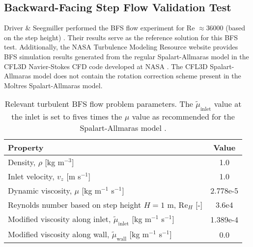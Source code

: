 \FloatBarrier

\subsection{Backward-Facing Step Flow Validation Test}

Driver \& Seegmiller performed the \gls{BFS} flow experiment for Re $\approx36000$ (based on the
step height)
\cite{driver_features_1985}. Their results serve as the reference solution for this \gls{BFS} test.
Additionally, the \gls{NASA} Turbulence Modeling Resource website \cite{rumsey_turbulence_nodate}
provides \gls{BFS} simulation results generated from the regular Spalart-Allmaras model in the CFL3D
Navier-Stokes CFD code developed at \gls{NASA} \cite{krist_cfl3d_1998}. The CFL3D Spalart-Allmaras model
does not contain the rotation correction scheme
\cite{aupoix_extensions_2003, dacles-mariani_numericalexperimental_1995} present in the Moltres
Spalart-Allmaras model.

\begin{table}[htb]
  \centering
  \small
  \caption{Relevant turbulent \gls{BFS} flow problem parameters. The $\tilde{\mu}_\text{inlet}$ value
  at the inlet is set to fives times the $\mu$ value as recommended for the Spalart-Allmaras model
  \cite{spalart_one-equation_1994}.}
  \begin{tabular}{l S}
    \toprule
    Property & {Value} \\
    \midrule
    Density, $\rho$ [kg m$^{-3}$] & 1.0 \\
    Inlet velocity, $v_z$ [m s$^{-1}$] & 1.0 \\
    Dynamic viscosity, $\mu$ [kg m$^{-1}$ s$^{-1}$] & 2.778e-5 \\
    Reynolds number based on step height $H=1$ m, Re$_H$ [-] & 3.6e4 \\
    Modified viscosity along inlet, $\tilde{\mu}_\text{inlet}$ [kg m$^{-1}$ s$^{-1}$] & 1.389e-4 \\
    Modified viscosity along wall, $\tilde{\mu}_\text{wall}$ [kg m$^{-1}$ s$^{-1}$] & 0.0 \\
    \bottomrule
  \end{tabular}
  \label{table:bfs}
\end{table}

